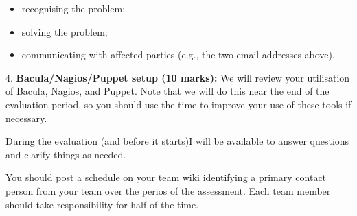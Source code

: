 \documentclass{article}   	%
\begin{document}
 \begin{itemize}
  \item recognising the problem;
  \item solving the problem;
  \item communicating with affected parties (e.g., the two email addresses above).
\end{itemize}

4.  \textbf{Bacula/Nagios/Puppet setup (10 marks):} We will review your utilisation of Bacula, Nagios, and Puppet.  Note that we will do this near the end of the evaluation period, so you should use the time to improve your use of these tools if necessary.

During the evaluation (and before it starts)I will be available to answer questions and clarify things as needed.

You should post a schedule on your team wiki identifying a primary contact person from your team over the perios of the assessment. Each team member should take responsibility for half of the time.
\end{document}
